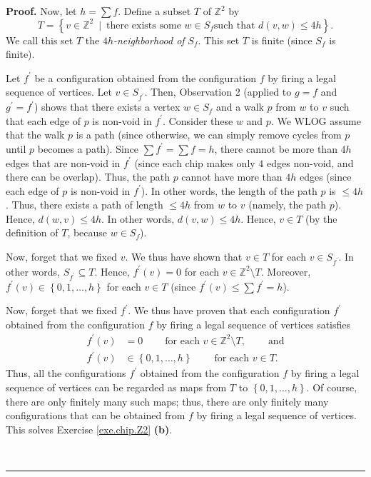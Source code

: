 \documentclass[numbers=enddot,12pt,final,onecolumn,notitlepage]{scrartcl}%
\theoremstyle{definition}
\newenvironment{proof}[1][Proof]{\noindent\textbf{#1.} }{\ \rule{0.5em}{0.5em}}
\let\sumnonlimits\sum
\renewcommand{\sum}{\sumnonlimits\limits}
\newcommand{\tup}[1]{\left( #1 \right)}
\begin{document}
\begin{proof}
Now, let $h=\sum f$. Define a subset $T$ of $\mathbb{Z}^{2}$ by%
\[
T=\left\{  v\in\mathbb{Z}^{2}\ \mid\ \text{there exists some }w\in S_{f}\text{
such that }d\left(  v,w\right)  \leq4h\right\}  .
\]
We call this set $T$ the $4h$\textit{-neighborhood of }$S_{f}$. This set $T$
is finite (since $S_{f}$ is finite).

Let $f^{\prime}$ be a configuration obtained from the configuration $f$ by
firing a legal sequence of vertices. Let $v\in S_{f^{\prime}}$. Then,
Observation 2 (applied to $g=f$ and $g^{\prime}=f^{\prime}$) shows that there
exists a vertex $w\in S_{f}$ and a walk $p$ from $w$ to $v$ such that each
edge of $p$ is non-void in $f^{\prime}$. Consider these $w$ and $p$. We WLOG
assume that the walk $p$ is a path (since otherwise, we can simply remove
cycles from $p$ until $p$ becomes a path). Since $\sum f^{\prime}=\sum f=h$,
there cannot be more than $4h$ edges that are non-void in $f^{\prime}$ (since
each chip makes only $4$ edges non-void, and there can be overlap). Thus, the
path $p$ cannot have more than $4h$ edges (since each edge of $p$ is non-void
in $f^{\prime}$). In other words, the length of the path $p$ is $\leq4h$.
Thus, there exists a path of length $\leq4h$ from $w$ to $v$ (namely, the path
$p$). Hence, $d\left(  w,v\right)  \leq4h$. In other words,
$d \tup{v, w} \leq 4h$.
Hence, $v\in T$ (by the definition of $T$, because $w\in S_{f}$).

Now, forget that we fixed $v$. We thus have shown that $v\in T$ for each $v\in
S_{f^{\prime}}$. In other words, $S_{f^{\prime}}\subseteq T$. Hence,
$f^{\prime}\left(  v\right)  =0$ for each $v\in\mathbb{Z}^{2}\setminus T$.
Moreover, $f^{\prime}\left(  v\right)  \in\left\{  0,1,\ldots,h\right\}  $ for
each $v\in T$ (since $f^{\prime}\left(  v\right)  \leq\sum f^{\prime}=h$).

Now, forget that we fixed $f^{\prime}$. We thus have proven that each
configuration $f^{\prime}$ obtained from the configuration $f$ by firing a
legal sequence of vertices satisfies
\begin{align*}
f^{\prime}\left(  v\right)   &  =0\ \ \ \ \ \ \ \ \ \ \text{for each }%
v\in\mathbb{Z}^{2}\setminus T,\ \ \ \ \ \ \ \ \ \ \text{and}\\
f^{\prime}\left(  v\right)   &  \in\left\{  0,1,\ldots,h\right\}
\ \ \ \ \ \ \ \ \ \ \text{for each }v\in T.
\end{align*}
Thus, all the configurations $f^{\prime}$ obtained from the configuration $f$ by
firing a legal sequence of vertices can be regarded as maps from $T$ to
$\left\{  0,1,\ldots,h\right\}  $. Of course, there are only finitely many
such maps; thus, there are only finitely many configurations that can be
obtained from $f$ by firing a legal sequence of vertices. This solves Exercise
\ref{exe.chip.Z2} \textbf{(b)}.


\end{proof}
\end{document}
